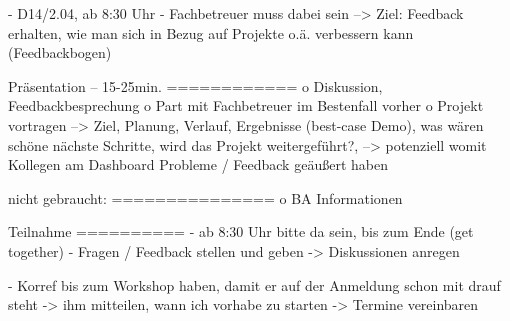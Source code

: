 -	D14/2.04, ab 8:30 Uhr
-	Fachbetreuer muss dabei sein
--> Ziel: Feedback erhalten, wie man sich in Bezug auf Projekte o.ä. verbessern kann (Feedbackbogen)

Präsentation – 15-25min.
============
o	Diskussion, Feedbackbesprechung
o	Part mit Fachbetreuer im Bestenfall vorher
o	Projekt vortragen
--> Ziel, Planung, Verlauf, Ergebnisse (best-case Demo), was wären schöne nächste Schritte, wird das Projekt weitergeführt?, 
--> potenziell womit Kollegen am Dashboard Probleme / Feedback geäußert haben

nicht gebraucht:
===============
o	BA Informationen

Teilnahme
==========
-	ab 8:30 Uhr bitte da sein, bis zum Ende (get together)
-	Fragen / Feedback stellen und geben -> Diskussionen anregen

-	Korref bis zum Workshop haben, damit er auf der Anmeldung schon mit drauf steht
-> ihm mitteilen, wann ich vorhabe zu starten
-> Termine vereinbaren
